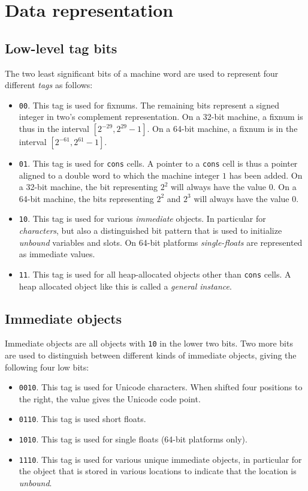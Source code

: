 \chapter{Data representation}
\label{chap-data-representation}

\section{Low-level tag bits}

The two least significant bits of a machine word are used to represent
four different \emph{tags} as follows:

\begin{itemize}
\item \texttt{00}.  This tag is used for fixnums.  The remaining bits
  represent a signed integer in two's complement representation.  On a
  32-bit machine, a fixnum is thus in the interval $[2^{-29}, 2^{29} -
    1]$.  On a 64-bit machine, a fixnum is in the interval $[2^{-61}, 2^{61} -
    1]$.  
\item \texttt{01}.  This tag is used for \texttt{cons} cells.  A
  pointer to a \texttt{cons} cell is thus a pointer aligned to a
  double word to which the machine integer $1$ has been added.  On a
  32-bit machine, the bit representing $2^2$ will always have the
  value $0$.  On a 64-bit machine, the bits representing $2^2$ and
  $2^3$ will always have the value $0$.
\item \texttt{10}.  This tag is used for various \emph{immediate}
  objects.  In particular for \emph{characters}, but also a
  distinguished bit pattern that is used to initialize \emph{unbound}
  variables and slots.  On 64-bit platforms \emph{single-floats} are
  represented as immediate values. 
\item \texttt{11}.  This tag is used for all heap-allocated objects
  other than \texttt{cons} cells.  A heap allocated object like this
  is called a \emph{general instance}.
\end{itemize}

\section{Immediate objects}

Immediate objects are all objects with \texttt{10} in the lower two
bits.  Two more bits are used to distinguish between different kinds
of immediate objects, giving the following four low bits:

\begin{itemize}
\item \texttt{0010}.  This tag is used for Unicode characters.  When
  shifted four positions to the right, the value gives the Unicode
  code point. 
\item \texttt{0110}.  This tag is used short floats.  
\item \texttt{1010}.  This tag is used for single floats (64-bit
  platforms only). 
\item \texttt{1110}.  This tag is used for various unique immediate
  objects, in particular for the object that is stored in various
  locations to indicate that the location is \emph{unbound}. 
\end{itemize}

